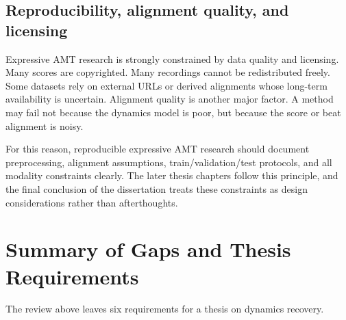 \subsection{Reproducibility, alignment quality, and licensing}
\label{sec:bg:dataeval:repro}

Expressive AMT research is strongly constrained by data quality and licensing. Many scores are copyrighted. Many recordings cannot be redistributed freely. Some datasets rely on external URLs or derived alignments whose long-term availability is uncertain. Alignment quality is another major factor. A method may fail not because the dynamics model is poor, but because the score or beat alignment is noisy.

For this reason, reproducible expressive AMT research should document preprocessing, alignment assumptions, train/validation/test protocols, and all modality constraints clearly. The later thesis chapters follow this principle, and the final conclusion of the dissertation treats these constraints as design considerations rather than afterthoughts.

\section{Summary of Gaps and Thesis Requirements}
\label{sec:bg:summary}

The review above leaves six requirements for a thesis on dynamics recovery. 

